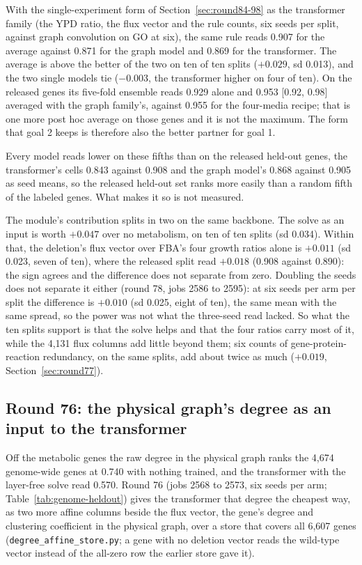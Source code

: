 With the single-experiment form of Section~\ref{sec:round84-98} as the transformer family
(the YPD ratio, the flux vector and the rule counts, six seeds per split, against graph
convolution on GO at six), the same rule reads 0.907 for the average against 0.871 for
the graph model and 0.869 for the transformer. The average is above the better of the two
on ten of ten splits ($+0.029$, sd 0.013), and the two single models tie ($-0.003$, the
transformer higher on four of ten). On the released genes its five-fold ensemble reads 0.929 alone and 0.953 [0.92, 0.98]
averaged with the graph family's, against 0.955 for the four-media recipe; that is one
more post hoc average on those genes and it is not the maximum. The form that goal 2 keeps is therefore also the
better partner for goal 1.

Every model reads lower on these fifths than on the released held-out genes, the
transformer's cells 0.843 against 0.908 and the graph model's 0.868 against 0.905 as seed
means, so the
released held-out set ranks more easily than a random fifth of the labeled genes. What
makes it so is not measured.

The module's contribution splits in two on the same backbone. The solve as an input is
worth $+0.047$ over no metabolism, on ten of ten splits (sd 0.034). Within that, the
deletion's flux vector over FBA's four growth ratios alone is $+0.011$ (sd 0.023, seven
of ten), where the released split read $+0.018$ (0.908 against 0.890): the sign agrees
and the difference does not separate from zero. Doubling the seeds does not separate it
either (round 78, jobs 2586 to 2595): at six seeds per arm per split the difference is
$+0.010$ (sd 0.025, eight of ten), the same mean with the same spread, so the power was
not what the three-seed read lacked. So what the ten splits support is that the solve
helps and that the four ratios carry most of it, while the 4,131 flux columns add
little beyond them; six counts of gene-protein-reaction redundancy, on the same splits,
add about twice as much ($+0.019$, Section~\ref{sec:round77}).

\subsection{Round 76: the physical graph's degree as an input to the transformer}
\label{sec:round76}

Off the metabolic genes the raw degree in the physical graph ranks the 4,674 genome-wide
genes at 0.740 with nothing trained, and the transformer with the layer-free solve read
0.570. Round 76 (jobs 2568 to 2573, six seeds per arm; Table~\ref{tab:genome-heldout})
gives the transformer that degree the cheapest way, as two more affine columns beside
the flux vector, the gene's degree and clustering coefficient in the physical graph,
over a store that covers all 6,607 genes (\texttt{degree\_affine\_store.py}; a gene
with no deletion vector reads the wild-type vector instead of the all-zero row the
earlier store gave it).

